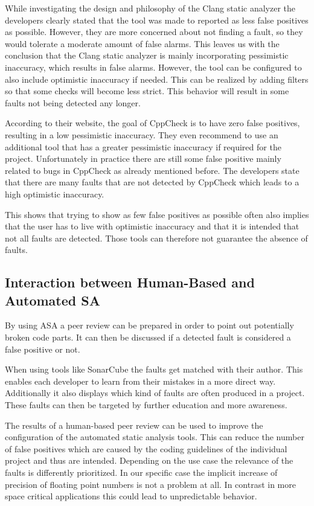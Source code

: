 \documentclass{scrartcl}
\begin{document}
While investigating the design and philosophy of the Clang static analyzer the developers clearly stated that the tool was made to reported as less false positives as possible. However, they are more concerned about not finding a fault, so they would tolerate a moderate amount of false alarms. This leaves us with the conclusion that the Clang static analyzer is mainly incorporating pessimistic inaccuracy, which results in false alarms. However, the tool can be configured to also include optimistic inaccuracy if needed. This can be realized by adding filters so that some checks will become less strict. This behavior will result in some faults not being detected any longer.

According to their website, the goal of CppCheck is to have zero false positives, resulting in a low pessimistic inaccuracy. They even recommend to use an additional tool that has a greater pessimistic inaccuracy if required for the project. Unfortunately in practice there are still some false positive mainly related to bugs in CppCheck as already mentioned before. The developers state that there are many faults that are not detected by CppCheck which leads to a high optimistic inaccuracy.

This shows that trying to show as few false positives as possible often also implies that the user has to live with optimistic inaccuracy and that it is intended that not all faults are detected. Those tools can therefore not guarantee the absence of faults.

\subsection{Interaction between Human-Based and Automated SA}

By using ASA a peer review can be prepared in order to point out potentially broken code parts. It can then be discussed if a detected fault is considered a false positive or not.

When using tools like SonarCube the faults get matched with their author. This enables each developer to learn from their mistakes in a more direct way. Additionally it also displays which kind of faults are often produced in a project. These faults can then be targeted by further education and more awareness.

The results of a human-based peer review can be used to improve the configuration of the automated static analysis tools. This can reduce the number of false positives which are caused by the coding guidelines of the individual project and thus are intended.
Depending on the use case the relevance of the faults is differently prioritized. In our specific case the implicit increase of precision of floating point numbers is not a problem at all. In contrast in more space critical applications this could lead to unpredictable behavior.
\end{document}
